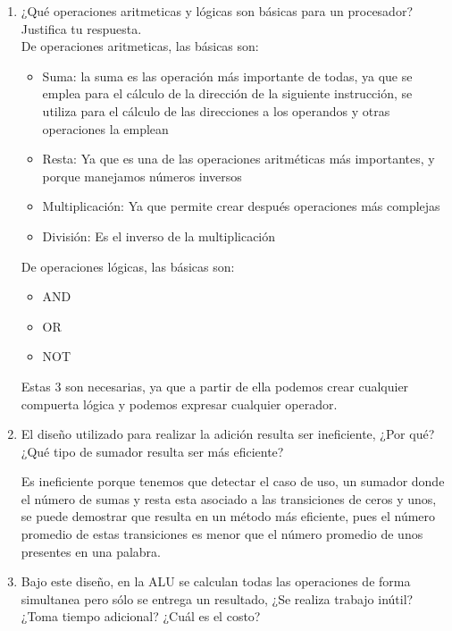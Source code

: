 \documentclass{article}
\begin{document}
    \begin{enumerate}
        \item 
            ¿Qué operaciones aritmeticas y lógicas son básicas para un procesador?
Justifica tu respuesta.\\

De operaciones aritmeticas, las básicas son:
\begin{itemize}
\item
Suma: la suma es las operación más importante de todas, ya que se emplea para el cálculo de la dirección de la siguiente instrucción, se utiliza para el cálculo de las direcciones a los operandos y otras operaciones la emplean
\item
Resta: Ya que es una de las operaciones aritméticas más importantes, y porque manejamos números inversos
\item
Multiplicación: Ya que permite crear después operaciones más complejas
\item
División: Es el inverso de la multiplicación
\end{itemize}

De operaciones lógicas, las básicas son:
\begin{itemize}
\item
AND
\item
OR
\item
NOT
\end{itemize}
Estas 3 son necesarias, ya que a partir de ella podemos crear cualquier compuerta lógica y podemos expresar cualquier operador.\\				

		\item
		El diseño utilizado para realizar la adición resulta ser ineficiente, ¿Por qué? ¿Qué tipo de sumador resulta ser más eficiente?
		
		Es ineficiente porque tenemos que detectar el caso de uso, un sumador donde el número de sumas y resta esta asociado a las transiciones de ceros y unos, se puede
demostrar que resulta en un método más eficiente, pues el número promedio de estas
transiciones es menor que el número promedio de unos presentes en una palabra.\\
		
	
		\item
		Bajo este diseño, en la ALU se calculan todas las operaciones de forma
simultanea pero sólo se entrega un resultado, ¿Se realiza trabajo inútil?
¿Toma tiempo adicional? ¿Cuál es el costo?\\


\end{enumerate}
\end{document}
